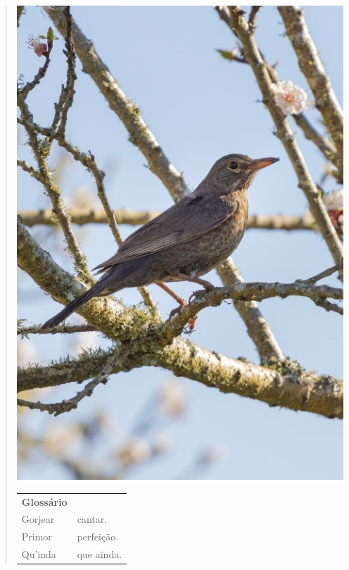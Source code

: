 \begin{quote}
\begin{minipage}{.5\textwidth}
\begin{verse}
\end{verse}
\end{minipage}\hspace{1cm}
\begin{minipage}{.5\textwidth}
\includegraphics[width=\textwidth]{./imgs/img17.jpg}
\end{minipage}

\begin{tabular}{ll}
\textbf{Glossário} & \mbox{}\\
Gorjear & cantar.\\
Primor & perfeição.\\
Qu'inda & que ainda.\\
\end{tabular}


\end{quote}
